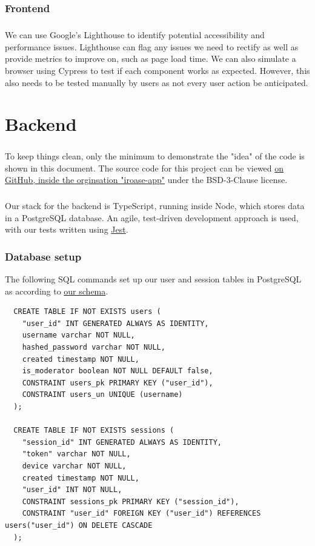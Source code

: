 \documentclass{report}
\begin{document}
\subsection{Frontend}
\paragraph{}
We can use Google's Lighthouse to identify potential accessibility and performance issues. Lighthouse can flag any issues we need to rectify as well as provide metrics to improve on, such as page load time. We can also simulate a browser using Cypress to test if each component works as expected. However, this also needs to be tested manually by users as not every user action be anticipated.

\chapter{Backend}
\paragraph{}
To keep things clean, only the minimum to demonstrate the "idea" of the code is shown in this document. The source code for this project can be viewed \href{https://github.com/iroase-app}{on GitHub, inside the orginsation "iroase-app"} under the BSD-3-Clause license.

\paragraph{}
Our stack for the backend is TypeScript, running inside Node, which stores data in a PostgreSQL database. An agile, test-driven development approach is used, with our tests written using \href{https://jestjs.io}{Jest}.

\subsection{Database setup}
The following SQL commands set up our user and session tables in PostgreSQL as according to \hyperref[fig:database1]{our schema}.

\begin{verbatim}
  CREATE TABLE IF NOT EXISTS users (
    "user_id" INT GENERATED ALWAYS AS IDENTITY,
    username varchar NOT NULL,
    hashed_password varchar NOT NULL,
    created timestamp NOT NULL,
    is_moderator boolean NOT NULL DEFAULT false,
    CONSTRAINT users_pk PRIMARY KEY ("user_id"),
    CONSTRAINT users_un UNIQUE (username)
  );

  CREATE TABLE IF NOT EXISTS sessions (
    "session_id" INT GENERATED ALWAYS AS IDENTITY,
    "token" varchar NOT NULL,
    device varchar NOT NULL,
    created timestamp NOT NULL,
    "user_id" INT NOT NULL,
    CONSTRAINT sessions_pk PRIMARY KEY ("session_id"),
    CONSTRAINT "user_id" FOREIGN KEY ("user_id") REFERENCES users("user_id") ON DELETE CASCADE
  );
\end{verbatim}
\end{document}
